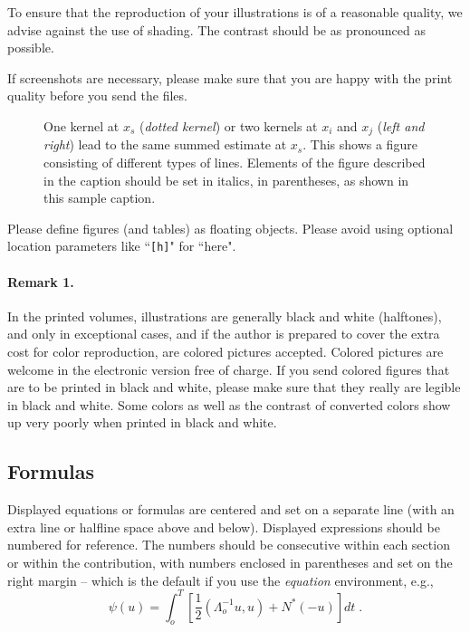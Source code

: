 \documentclass[runningheads,a4paper]{llncs}
\begin{document}
To ensure that the reproduction of your illustrations is of a reasonable
quality, we advise against the use of shading. The contrast should be as
pronounced as possible.

If screenshots are necessary, please make sure that you are happy with
the print quality before you send the files.
\begin{figure}
\centering
\caption{One kernel at $x_s$ (\emph{dotted kernel}) or two kernels at
$x_i$ and $x_j$ (\textit{left and right}) lead to the same summed estimate
at $x_s$. This shows a figure consisting of different types of
lines. Elements of the figure described in the caption should be set in
italics, in parentheses, as shown in this sample caption.}
\label{fig:example}
\end{figure}

Please define figures (and tables) as floating objects. Please avoid
using optional location parameters like ``\verb+[h]+" for ``here".

\paragraph{Remark 1.}

In the printed volumes, illustrations are generally black and white
(halftones), and only in exceptional cases, and if the author is
prepared to cover the extra cost for color reproduction, are colored
pictures accepted. Colored pictures are welcome in the electronic
version free of charge. If you send colored figures that are to be
printed in black and white, please make sure that they really are
legible in black and white. Some colors as well as the contrast of
converted colors show up very poorly when printed in black and white.

\subsection{Formulas}

Displayed equations or formulas are centered and set on a separate
line (with an extra line or halfline space above and below). Displayed
expressions should be numbered for reference. The numbers should be
consecutive within each section or within the contribution,
with numbers enclosed in parentheses and set on the right margin --
which is the default if you use the \emph{equation} environment, e.g.,
\begin{equation}
  \psi (u) = \int_{o}^{T} \left[\frac{1}{2}
  \left(\Lambda_{o}^{-1} u,u\right) + N^{\ast} (-u)\right] dt \;  .
\end{equation}
\end{document}

